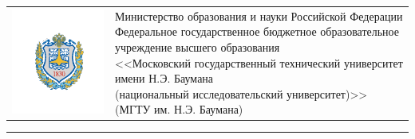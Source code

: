\documentclass[../template.tex]{subfiles}
\begin{document}
	\begin{titlepage}
		\vspace*{-2.5cm}
		\begin{center}
			\begin{tabular}{C{3cm}C{13cm}}\vspace{-0.5cm}
				\includegraphics[trim=10 10 10 10,clip,width=\linewidth]{../images/titul/mgtu.pdf}&{\small {}
				Министерство образования и науки Российской Федерации\newline
				Федеральное государственное бюджетное образовательное\newline
				учреждение высшего образования\newline
				<<Московский государственный технический университет\newline
				имени Н.Э. Баумана\newline
				(национальный исследовательский университет)>>\newline
				(МГТУ им. Н.Э. Баумана)\par}
			\end{tabular}
		\end{center}
	
	\noindent\rule{\textwidth}{4pt}
	

\end{titlepage}
\end{document}
